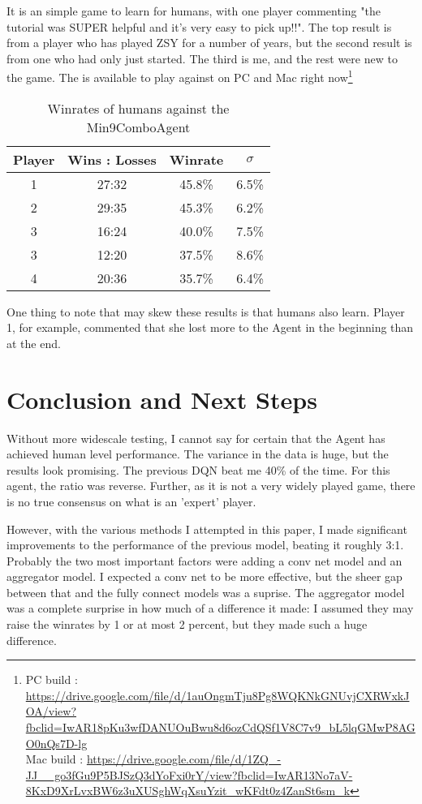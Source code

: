 \documentclass{article}
\newcommand{\beginTable}[2]{
\begin{table}[t]
\caption{#1}
\vskip 0.15in
\begin{center}
\begin{small}
\begin{sc}
\begin{tabular}{#2}
\toprule
}
\newcommand{\finTable}{
\bottomrule
\end{tabular}
\end{sc}
\end{small}
\end{center}
\vskip -0.1in
\end{table}
}
\begin{document}
It is an simple game to learn for humans, with one player commenting "the tutorial was SUPER helpful and it’s very easy to pick up!!". The top result is from a player who has played ZSY for a number of years, but the second result is from one who had only just started. The third is me, and the rest were new to the game. The is available to play against on PC and Mac right now\footnote{PC build : \url{https://drive.google.com/file/d/1auOngmTju8Pg8WQKNkGNUvjCXRWxkJOA/view?fbclid=IwAR18pKu3wfDANUOuBwu8d6ozCdQSf1V8C7v9_bL5lqGMwP8AGO0nQs7D-lg}\\
Mac build : \url{https://drive.google.com/file/d/1ZQ_-JJ__go3fGu9P5BJSzQ3dYoFxi0rY/view?fbclid=IwAR13No7aV-8KxD9XrLvxBW6z3uXUSghWqXsuYzit_wKFdt0z4ZanSt6sm_k}}

\beginTable{Winrates of humans against the Min9ComboAgent}{cccc}
Player & Wins : Losses & Winrate & $\sigma$  \\
\midrule
1 & 27:32 & 45.8\% & 6.5\% \\
2 & 29:35 & 45.3\% & 6.2\% \\
3 & 16:24 & 40.0\% & 7.5\% \\
3 & 12:20 & 37.5\% & 8.6\% \\
4 & 20:36 & 35.7\% & 6.4\% \\
\finTable

One thing to note that may skew these results is that humans also learn. Player 1, for example, commented that she lost more to the Agent in the beginning than at the end.

\section{Conclusion and Next Steps}
Without more widescale testing, I cannot say for certain that the Agent has achieved human level performance. The variance in the data is huge, but the results look promising. The previous DQN beat me 40\% of the time. For this agent, the ratio was reverse. Further, as it is not a very widely played game, there is no true consensus on what is an 'expert' player.

However, with the various methods I attempted in this paper, I made significant improvements to the performance of the previous model, beating it roughly 3:1. Probably the two most important factors were adding a conv net model and an aggregator model. I expected a conv net to be more effective, but the sheer gap between that and the fully connect models was a suprise. The aggregator model was a complete surprise in how much of a difference it made: I assumed they may raise the winrates by 1 or at most 2 percent, but they made such a huge difference.
\end{document}
